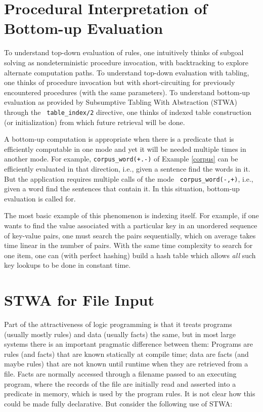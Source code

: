 \section{Procedural Interpretation of Bottom-up Evaluation}

To understand top-down evaluation of rules, one intuitively thinks of
subgoal solving as nondeterministic procedure invocation, with
backtracking to explore alternate computation paths.  To understand
top-down evaluation with tabling, one thinks of procedure invocation
but with short-circuiting for previously encountered procedures (with
the same parameters).  To understand bottom-up evaluation as provided
by Subsumptive Tabling With Abstraction (STWA) through the {\tt
  table\_index/2} directive, one thinks of indexed table construction
(or initialization) from which future retrieval will be done.

A bottom-up computation is appropriate when there is a predicate that
is efficiently computable in one mode and yet it will be needed
multiple times in another mode.  For example, {\tt corpus\_word(+.-)}
of Example \ref{corpus} can be efficiently evaluated in that
direction, i.e., given a sentence find the words in it.  But the
application requires multiple calls of the mode {\tt
  corpus\_word(-,+)}, i.e., given a word find the sentences that
contain it.  In this situation, bottom-up evaluation is called for.

The most basic example of this phenomenon is indexing itself.  For
example, if one wants to find the value associated with a particular
key in an unordered sequence of key-value pairs, one must search the
pairs sequentially, which on average takes time linear in the number
of pairs.  With the same time complexity to search for one item, one
can (with perfect hashing) build a hash table which allows {\em all}
such key lookups to be done in constant time.

\section{STWA for File Input}

Part of the attractiveness of logic programming is that it treats
programs (usually mostly rules) and data (usually facts) the same, but
in most large systems there is an important pragmatic difference
between them: Programs are rules (and facts) that are known statically
at compile time; data are facts (and maybe rules) that are not known
until runtime when they are retrieved from a file.  Facts are normally
accessed through a filename passed to an executing program, where the
records of the file are initially read and asserted into a predicate
in memory, which is used by the program rules.  It is not clear how
this could be made fully declarative.  But consider the following use
of STWA:

